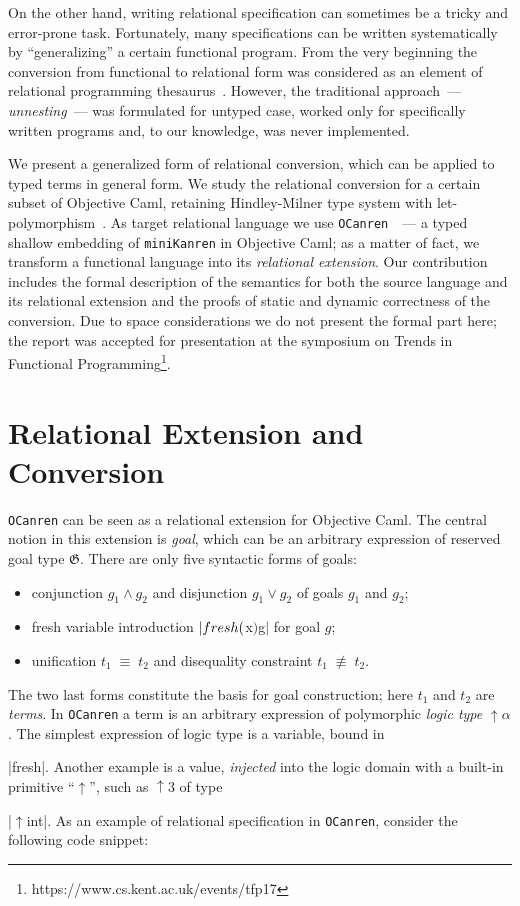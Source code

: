 \documentclass[10pt, oneside, nocopyrightspace]{sigplanconf}
\newcommand{\G}{\mathfrak G}
\newcommand{\miniKanren}{\texttt{miniKanren}\xspace}
\newcommand{\OCanren}{\texttt{OCanren}\xspace}
\newcommand*{\SavedLstInline}{}
\DeclareRobustCommand*{\lstinline}{%
  \ifmmode
    \let\SavedBGroup\bgroup
    \def\bgroup{%
      \let\bgroup\SavedBGroup
      \hbox\bgroup
    }%
  \fi
  \SavedLstInline
}
\begin{document}
On the other hand, writing relational specification can sometimes be a tricky and error-prone task. Fortunately, many 
specifications can be written systematically by ``generalizing'' a certain functional program. From the very beginning 
the conversion from functional to relational form was considered as an element of relational programming thesaurus~\cite{TRS}. However,
the traditional approach~--- \emph{unnesting}~--- was formulated for untyped case, worked only for specifically written
programs and, to our knowledge, was never implemented.

We present a generalized form of relational conversion, which can be applied to typed terms in general form. We study the relational conversion 
for a certain subset of Objective Caml, retaining Hindley-Milner type system with let-polymorphism~\cite{Types}. As target
relational language we use \OCanren~\cite{ocanren}~--- a typed shallow embedding of \miniKanren in Objective Caml; as a matter of fact, 
we transform a functional language into its \emph{relational extension}. Our contribution includes the formal description of the semantics for 
both the source language and its relational extension and the proofs of static and dynamic correctness of the conversion. Due to space
considerations we do not present the formal part here; the report was accepted for presentation at the symposium on Trends in Functional 
Programming\footnote{https://www.cs.kent.ac.uk/events/tfp17}.

\section{Relational Extension and Conversion}

\OCanren can be seen as a relational extension for Objective Caml. The central notion in this extension is \emph{goal}, which can be an arbitrary 
expression of reserved goal type $\G$. There are only five syntactic forms of goals:

\begin{itemize}
  \item conjunction $g_1\wedge g_2$ and disjunction $g_1\vee g_2$ of goals $g_1$ and $g_2$;
  \item fresh variable introduction $\lstinline|fresh ($x$) $\;g$|$ for goal $g$;
  \item unification $t_1\;\equiv\;t_2$ and disequality constraint $t_1\;\not\equiv\;t_2$.
\end{itemize}

The two last forms constitute the basis for goal construction; here $t_1$ and $t_2$ are \emph{terms}. In \OCanren a term is
an arbitrary expression of polymorphic \emph{logic type} $\uparrow\!\alpha$. The simplest expression of logic type is a variable, 
bound in \lstinline|fresh|. Another example is a value, \emph{injected} into the logic domain with a built-in primitive 
``$\uparrow$'', such as $\uparrow\!3$ of type \lstinline|$\uparrow$int|. As an example of relational specification in \OCanren, 
consider the following code snippet:
\end{document}
